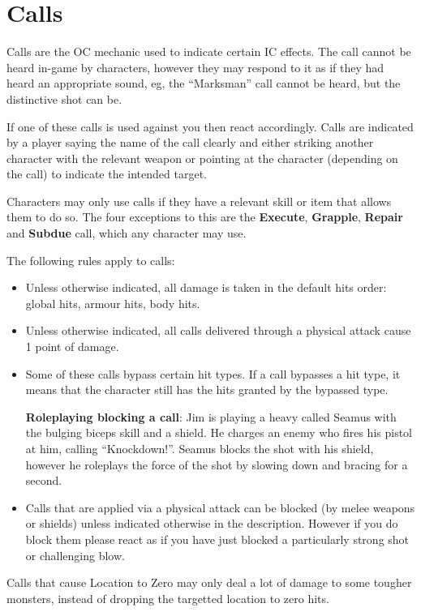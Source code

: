 \chapter{Calls}

Calls are the OC mechanic used to indicate certain IC effects. The call cannot be heard in-game by characters, however they may respond to it as if they had heard an appropriate sound, eg, the ``Marksman'' call cannot be heard, but the distinctive shot can be.

If one of these calls is used against you then react accordingly. Calls are indicated by a player saying the name of the call clearly and either striking another character with the relevant weapon or pointing at the character (depending on the call) to indicate the intended target.

Characters may only use calls if they have a relevant skill or item that allows them to do so. The four exceptions to this are the \textbf{Execute}, \textbf{Grapple}, \textbf{Repair} and \textbf{Subdue} call, which any character may use.

The following rules apply to calls:

\begin{itemize}
\item Unless otherwise indicated, all damage is taken in the default hits order: global hits, armour hits, body hits.

\item Unless otherwise indicated, all calls delivered through a physical attack cause 1 point of damage.

\item Some of these calls bypass certain hit types. If a call bypasses a hit type, it means that the character still has the hits granted by the bypassed type.

\textbf{Roleplaying blocking a call}: Jim is playing a heavy called Seamus with the bulging biceps skill and a shield. He charges an enemy who fires his pistol at him, calling ``Knockdown!''. Seamus blocks the shot with his shield, however he roleplays the force of the shot by slowing down and bracing for a second.

\item Calls that are applied via a physical attack can be blocked (by melee weapons or shields) unless indicated otherwise in the description. However if you do block them please react as if you have just blocked a particularly strong shot or challenging blow.

\end{itemize}
Calls that cause Location to Zero may only deal a lot of damage to some tougher monsters, instead of dropping the targetted location to zero hits.


